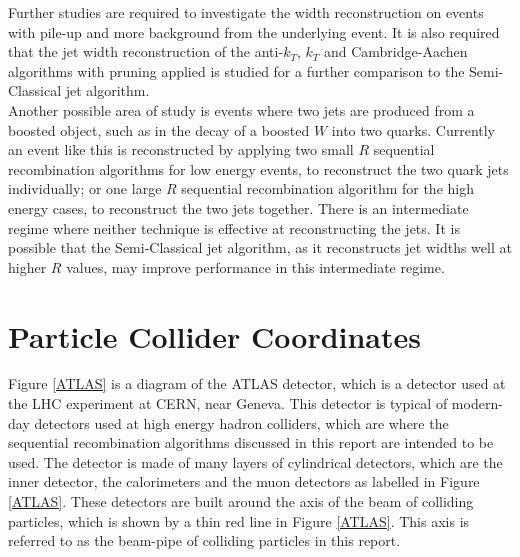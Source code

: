 \documentclass[a4paper,11pt, onecolumn]{article}
\begin{document}
  Further studies are required to investigate the width reconstruction on events with pile-up and more background from the underlying event. 
  It is also required that the jet width reconstruction of the anti-$k_T$, $k_T$ and Cambridge-Aachen algorithms with pruning applied is 
  studied for a further comparison to the Semi-Classical jet algorithm. \\

  Another possible area of study is events where two jets are produced from a boosted object, such as in the decay of a boosted $W$ into two quarks. 
  Currently an event like this is reconstructed by applying two small $R$ sequential recombination algorithms for low energy events, to reconstruct 
  the two quark jets individually; or one large $R$ sequential recombination algorithm for the high energy cases, to reconstruct the two jets together. 
  There is an intermediate regime where neither technique is effective at reconstructing the jets. It is possible that the Semi-Classical jet algorithm, 
  as it reconstructs jet widths well at higher $R$ values, may improve performance in this intermediate regime.
  
 

\newpage



\newpage
\appendix
\appendixpage
\section{Particle Collider Coordinates} \label{coordinates}

 Figure \ref{ATLAS} is a diagram of the ATLAS detector, which is a detector used at the LHC experiment at CERN, near Geneva. This detector is typical
 of modern-day detectors used at high energy hadron colliders, which are where the sequential recombination algorithms discussed in this report are intended
 to be used. The detector is made of many layers of cylindrical detectors, which are the inner detector, the calorimeters and the muon detectors as labelled 
 in Figure \ref{ATLAS}. These detectors are built around the axis of the beam of colliding particles, which is shown by a thin red line in Figure \ref{ATLAS}.
 This axis is referred to as the beam-pipe of colliding particles in this report.
 
\end{document}
